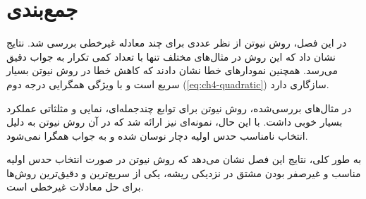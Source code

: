 \section{جمع‌بندی}

در این فصل، روش نیوتن از نظر عددی برای چند معادله غیرخطی بررسی شد. نتایج نشان داد که این روش در مثال‌های مختلف تنها با تعداد کمی تکرار به جواب دقیق می‌رسد. همچنین نمودارهای خطا نشان دادند که کاهش خطا در روش نیوتن بسیار سریع است و با ویژگی همگرایی درجه دوم (\eqref{eq:ch4-quadratic}) سازگاری دارد.

در مثال‌های بررسی‌شده، روش نیوتن برای توابع چندجمله‌ای، نمایی و مثلثاتی عملکرد بسیار خوبی داشت. با این حال، نمونه‌ای نیز ارائه شد که در آن روش نیوتن به دلیل انتخاب نامناسب حدس اولیه دچار نوسان شده و به جواب همگرا نمی‌شود.

به طور کلی، نتایج این فصل نشان می‌دهد که روش نیوتن در صورت انتخاب حدس اولیه مناسب و غیرصفر بودن مشتق در نزدیکی ریشه، یکی از سریع‌ترین و دقیق‌ترین روش‌ها برای حل معادلات غیرخطی است.